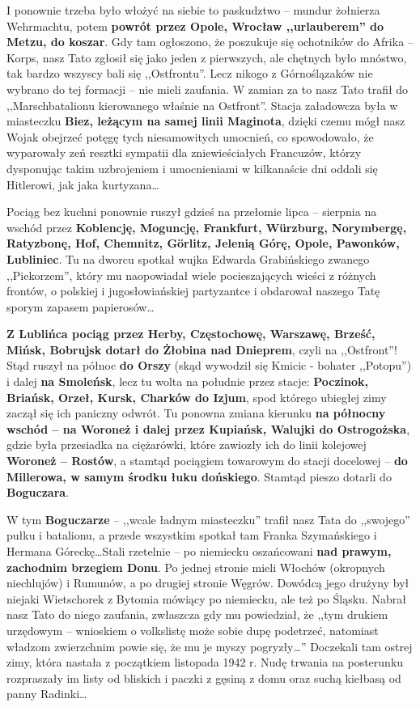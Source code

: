 I ponownie trzeba było włożyć na siebie to paskudztwo -- mundur żołnierza Wehrmachtu, potem \textbf{powrót przez Opole, Wrocław ,,urlauberem'' do Metzu, do koszar}. Gdy tam ogłoszono, że poszukuje się ochotników do Afrika – Korps, nasz Tato zgłosił się jako jeden z pierwszych, ale chętnych było mnóstwo, tak bardzo wszyscy bali się ,,Ostfrontu''. Lecz nikogo z Górnoślązaków nie wybrano do tej formacji -- nie mieli zaufania. W zamian za to nasz Tato trafił do ,,Marschbatalionu kierowanego właśnie na Ostfront''. Stacja załadowcza była w miasteczku \textbf{Biez, leżącym na samej linii Maginota}, dzięki czemu mógł nasz Wojak obejrzeć potęgę tych niesamowitych umocnień, co spowodowało, że wyparowały zeń resztki sympatii dla zniewieściałych Francuzów, którzy dysponując takim uzbrojeniem i umocnieniami w kilkanaście dni oddali się Hitlerowi, jak jaka kurtyzana\ldots

Pociąg bez kuchni ponownie ruszył gdzieś na przełomie lipca -- sierpnia na wschód przez \textbf{Koblencję, Moguncję, Frankfurt, Würzburg, Norymbergę, Ratyzbonę, Hof, Chemnitz, Görlitz, Jelenią Górę, Opole, Pawonków, Lubliniec}. Tu na dworcu spotkał wujka Edwarda Grabińskiego zwanego ,,Piekorzem'', który mu naopowiadał wiele pocieszających wieści z różnych frontów, o polskiej i jugosłowiańskiej partyzantce i obdarował naszego Tatę sporym zapasem papierosów\ldots

\textbf{Z Lublińca pociąg przez Herby, Częstochowę, Warszawę, Brześć, Mińsk, Bobrujsk dotarł do Żłobina nad Dnieprem}, czyli na ,,Ostfront''! Stąd ruszył na północ \textbf{do Orszy} (skąd wywodził się Kmicic - bohater ,,Potopu'') i dalej \textbf{na Smoleńsk}, lecz tu wolta na południe przez stacje: \textbf{Poczinok, Briańsk, Orzeł, Kursk, Charków do Izjum}, spod którego ubiegłej zimy zaczął się ich paniczny odwrót. Tu ponowna zmiana kierunku \textbf{na północny wschód – na Woroneż i dalej przez Kupiańsk, Walujki do Ostrogożska}, gdzie była przesiadka na ciężarówki, które zawiozły ich do linii kolejowej \textbf{Woroneż – Rostów}, a stamtąd pociągiem towarowym do stacji docelowej -- \textbf{do Millerowa, w samym środku łuku dońskiego}. Stamtąd pieszo dotarli do \textbf{Boguczara}. 

W tym \textbf{Boguczarze} -- ,,wcale ładnym miasteczku'' trafił nasz Tata do ,,swojego'' pułku i batalionu, a przede wszystkim spotkał tam Franka Szymańskiego i Hermana Góreckę\ldots Stali rzetelnie -- po niemiecku oszańcowani \textbf{nad prawym, zachodnim brzegiem Donu}. Po jednej stronie mieli Włochów (okropnych niechlujów) i Rumunów, a po drugiej stronie Węgrów. Dowódcą jego drużyny był niejaki Wietschorek z Bytomia mówiący po niemiecku, ale też po Śląsku. Nabrał nasz Tato do niego zaufania, zwłaszcza gdy mu powiedział, że ,,tym drukiem urzędowym -- wnioskiem o volkslistę może sobie dupę podetrzeć, natomiast władzom zwierzchnim powie się, że mu je myszy pogryzły\ldots'' Doczekali tam ostrej zimy, która nastała z początkiem listopada 1942 r. Nudę trwania na posterunku rozpraszały im listy od bliskich i paczki z gęsiną z domu oraz suchą kiełbasą od panny Radinki\ldots

